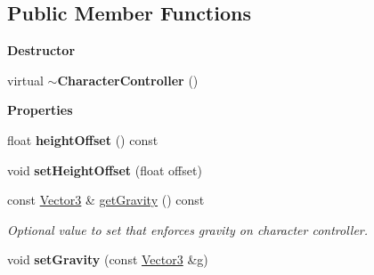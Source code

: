 \subsection*{Public Member Functions}
\begin{Indent}\textbf{ Destructor}\par
\begin{DoxyCompactItemize}
\item 
\mbox{\label{classrev_1_1_character_controller_a7b90c82ffd3e8449adccf8b6197ea0fc}} 
virtual {\bfseries $\sim$\+Character\+Controller} ()
\end{DoxyCompactItemize}
\end{Indent}
\begin{Indent}\textbf{ Properties}\par
\begin{DoxyCompactItemize}
\item 
\mbox{\label{classrev_1_1_character_controller_acc5a2d0a660c59d16fd7ee3a24e97c50}} 
float {\bfseries height\+Offset} () const
\item 
\mbox{\label{classrev_1_1_character_controller_a40da295c3f720014b857c09010ef9b73}} 
void {\bfseries set\+Height\+Offset} (float offset)
\item 
\mbox{\label{classrev_1_1_character_controller_af10084b64a061585feb6b87488523f8d}} 
const \mbox{\hyperlink{classrev_1_1_vector}{Vector3}} \& \mbox{\hyperlink{classrev_1_1_character_controller_af10084b64a061585feb6b87488523f8d}{get\+Gravity}} () const
\begin{DoxyCompactList}\small\item\em Optional value to set that enforces gravity on character controller. \end{DoxyCompactList}\item 
\mbox{\label{classrev_1_1_character_controller_a3744de214cc6cf9bc6faa2f739f3a981}} 
void {\bfseries set\+Gravity} (const \mbox{\hyperlink{classrev_1_1_vector}{Vector3}} \&g)
\item 
\mbox{\label{classrev_1_1_character_controller_a6a725e22b05564920d6daad5e838fa84}} 

\end{DoxyCompactItemize}
\end{Indent}
